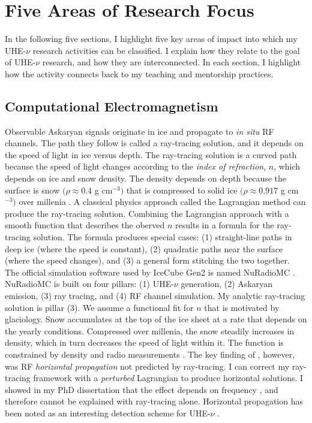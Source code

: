 \documentclass[../../../main.tex]{subfiles}
\begin{document}
\section{Five Areas of Research Focus}
In the following five sections, I highlight five key areas of impact into which my UHE-$\nu$ research activities can be classified.  I explain how they relate to the goal of UHE-$\nu$ research, and how they are interconnected.  In each section, I highlight how the activity connects back to my teaching and mentorship practices.

\subsection{Computational Electromagnetism}
\label{sec:cem}

Observable Askaryan signals originate in ice and propagate to \textit{in situ} RF channels.  The path they follow is called a ray-tracing solution, and it depends on the speed of light in ice versus depth.  The ray-tracing solution is a curved path because the speed of light changes according to the \textit{index of refraction}, $n$, which depends on ice and snow density.  The density depends on depth because the surface is snow $(\rho \approx 0.4$ g cm$^{-3})$ that is compressed to solid ice $(\rho \approx 0.917$ g cm$^{-3})$ over millenia \cite{10.3189/2015jog14j214}.  A classical physics approach called the Lagrangian method can produce the ray-tracing solution. Combining the Lagrangian approach with a smooth function that describes the oberved $n$ results in a formula for the ray-tracing solution.  The formula produces special cases: (1) straight-line paths in deep ice (where the speed is constant), (2) quadratic paths near the surface (where the speed changes), and (3) a general form stitching the two together.
\\
\vspace{0.25cm}
The official simulation software used by IceCube Gen2 is named NuRadioMC \cite{10.1140/epjc/s10052-020-7612-8}.  NuRadioMC is built on four pillars: (1) UHE-$\nu$ generation, (2) Askaryan emission, (3) ray tracing, and (4) RF channel simulation.  My analytic ray-tracing solution is pillar (3).  We assume a functional fit for $n$ that is motivated by glaciology.  Snow accumulates at the top of the ice sheet at a rate that depends on the yearly conditions.  Compressed over millenia, the snow steadily increases in density, which in turn decreases the speed of light within it.  The function is constrained by density and radio measurements \cite{Barwick:2018497}.  The key finding of \cite{Barwick:2018497}, however, was RF \textit{horizontal propagation} not predicted by ray-tracing.  I can correct my ray-tracing framework with a \textit{perturbed} Lagrangian to produce horizontal solutions.  I showed in my PhD dissertation that the effect depends on frequency \cite{hanson}, and therefore cannot be explained with ray-tracing alone.  Horizontal propagation has been noted as an interesting detection scheme for UHE-$\nu$ \cite{10.1103/physrevd.71.011503}.
\end{document}
